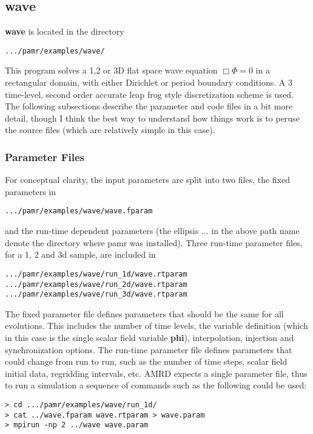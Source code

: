 \documentclass[aps,amssymb,unsortedaddress,nofootinbib]{revtex4}
\begin{document}
\subsection{wave}
{\bf wave} is located in the directory
\begin{verbatim}
.../pamr/examples/wave/
\end{verbatim}
This program solves a 1,2 or 3D flat space wave equation $\Box \Phi = 0$ in a rectangular domain,
with either Dirichlet or period boundary conditions. A 3 time-level, second
order accurate leap frog style discretization scheme is used. The following subsections
describe the parameter and code files in a bit more detail, though I think the best
way to understand how things work is to peruse the source files (which are 
relatively simple in this case).

\subsubsection{Parameter Files}\label{sec_wave_param}
For conceptual clarity, the input parameters are split into two files, the fixed parameters
in 
\begin{verbatim}
.../pamr/examples/wave/wave.fparam
\end{verbatim}
and the run-time dependent parameters (the ellipsis ... in the above path name denote
the directory where pamr was installed). Three run-time parameter files, for
a 1, 2 and 3d sample, are included in
\begin{verbatim}
.../pamr/examples/wave/run_1d/wave.rtparam
.../pamr/examples/wave/run_2d/wave.rtparam
.../pamr/examples/wave/run_3d/wave.rtparam
\end{verbatim}
The fixed parameter file defines parameters that should be the 
same for all evolutions. This includes the number of time levels, the variable
definition (which in this case is the single scalar field variable {\bf phi}),
interpolation, injection and synchronization options. The run-time parameter
file defines parameters that could change from run to run, such as the
number of time steps, scalar field initial data, regridding intervals, etc.
AMRD expects a single parameter file, thus to run a simulation a sequence
of commands such as the following could be used:
\begin{verbatim}
> cd .../pamr/examples/wave/run_1d/
> cat ../wave.fparam wave.rtparam > wave.param
> mpirun -np 2 ../wave wave.param
\end{verbatim}
\end{document}
